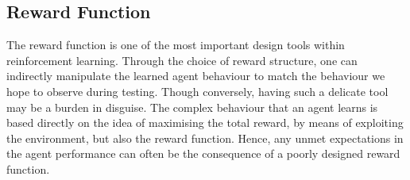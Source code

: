 \subsection{Reward Function}
\label{subsec:4_5_rewardFunction}

The reward function is one of the most important design tools within reinforcement learning. Through the choice of reward structure, one can indirectly manipulate the learned agent behaviour to match the behaviour we hope to observe during testing. Though conversely, having such a delicate tool may be a burden in disguise. The complex behaviour that an agent learns is based directly on the idea of maximising the total reward, by means of exploiting the environment, but also the reward function. Hence, any unmet expectations in the agent performance can often be the consequence of a poorly designed reward function.


